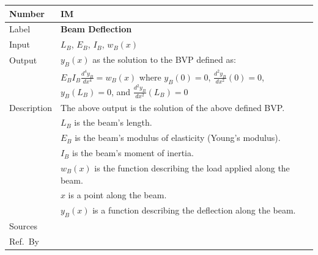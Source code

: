 \documentclass[12pt]{article}
\newcommand{\colAwidth}{0.13\textwidth}
\newcommand{\colBwidth}{0.82\textwidth}
\newcounter{instnum} %
\begin{document}

\noindent
\begin{minipage}{\textwidth}
    \renewcommand*{\arraystretch}{1.5}
    \begin{tabular}{| p{\colAwidth} | p{\colBwidth}|}
        \hline
        \rowcolor[gray]{0.9}
        Number      & IM{instnum}\theinstnum{}\label{im_deflection}           \\ \hline
        Label       & \bf Beam Deflection                                                    \\ \hline
        Input       & $L_B$, $E_B$, $I_B$, $w_{B}(x)$                                        \\ \hline
        Output      & \(y_{B}(x)\) as the solution to the BVP defined as:                    \\
                    & \(E_{B}I_{B}\frac{d^{4}y_{B}}{dx^{4}}=w_{B}(x)\) where \(y_{B}(0)=0\),
        \(\frac{d^{2}y_{B}}{dx^{2}}(0)=0\), \(y_{B}(L_B)=0\), and
        \(\frac{d^{2}y_{B}}{dx^{2}}(L_B)=0\)                                                 \\ \hline
        Description & The above output is the solution of the above defined BVP.             \\
                    & $L_B$ is the beam's length.                                            \\
                    & $E_B$ is the beam's modulus of elasticity (Young's modulus).           \\
                    & $I_B$ is the beam's moment of inertia.                                 \\
                    & $w_{B}(x)$ is the function describing the load applied along the beam. \\
                    & $x$ is a point along the beam.                                         \\
                    & $y_{B}(x)$ is a function describing the deflection along the beam.     \\ \hline
        Sources     & \nc{}                                                                  \\ \hline
        Ref.\ By    &                                                                        \\ \hline
    \end{tabular}
\end{minipage}\\
\end{document}
